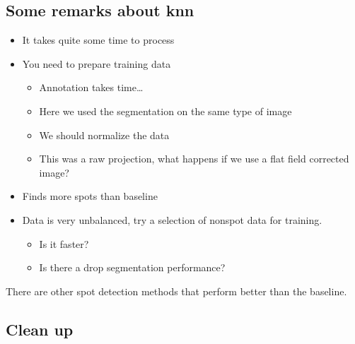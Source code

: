 \documentclass[letterpaper,10pt,english]{sphinxmanual}
\begin{document}
\subsection{Some remarks about k\sphinxhyphen{}nn}
\label{\detokenize{ML4NeutronImageSegmentation:some-remarks-about-k-nn}}\begin{itemize}
\item {} 
It takes quite some time to process

\item {} 
You need to prepare training data
\begin{itemize}
\item {} 
Annotation takes time…

\item {} 
Here we used the segmentation on the same type of image

\item {} 
We should normalize the data

\item {} 
This was a raw projection, what happens if we use a flat field corrected image?

\end{itemize}

\item {} 
Finds more spots than baseline

\item {} 
Data is very unbalanced, try a selection of non\sphinxhyphen{}spot data for training.
\begin{itemize}
\item {} 
Is it faster?

\item {} 
Is there a drop segmentation performance?

\end{itemize}

\end{itemize}

 There are other spot detection methods that perform better than the baseline.


\subsection{Clean up}
\label{\detokenize{ML4NeutronImageSegmentation:clean-up}}
\begin{sphinxVerbatim}[commandchars=\\\{\}]
 
\end{sphinxVerbatim}
\end{document}
